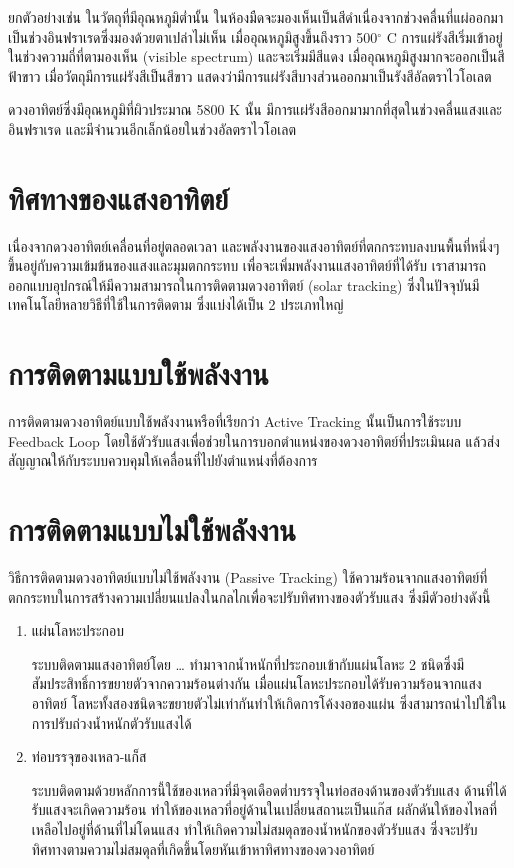 \documentclass[a4paper,nobib,openany]{tufte-book}
\begin{document}
ยกตัวอย่างเช่น ในวัตถุที่มีอุณหภูมิต่ำนั้น
ในห้องมืดจะมองเห็นเป็นสีดำเนื่องจากช่วงคลื่นที่แผ่ออกมาเป็นช่วงอินฟราเรดซึ่งมองด้วยตาเปล่าไม่เห็น
เมื่ออุณหภูมิสูงขึ้นถึงราว 500\(^{\circ}\) C
การแผ่รังสีเริ่มเข้าอยู่ในช่วงความถี่ที่ตามองเห็น (visible spectrum)
และจะเริ่มมีสีแดง เมื่ออุณหภูมิสูงมากจะออกเป็นสีฟ้าขาว
เมื่อวัตถุมีการแผ่รังสีเป็นสีขาว
แสดงว่ามีการแผ่รังสีบางส่วนออกมาเป็นรังสีอัลตราไวโอเลต

ดวงอาทิตย์ซึ่งมีอุณหภูมิที่ผิวประมาณ 5800 K นั้น
มีการแผ่รังสีออกมามากที่สุดในช่วงคลื่นแสงและอินฟราเรด
และมีจำนวนอีกเล็กน้อยในช่วงอัลตราไวโอเลต

\section{ทิศทางของแสงอาทิตย์}
\label{sec:org88cde3c}
เนื่องจากดวงอาทิตย์เคลื่อนที่อยู่ตลอดเวลา
และพลังงานของแสงอาทิตย์ที่ตกกระทบลงบนพื้นที่หนึ่งๆขึ้นอยู่กับความเข้มข้นของแสงและมุมตกกระทบ
เพื่อจะเพิ่มพลังงานแสงอาทิตย์ที่ได้รับ
เราสามารถออกแบบอุปกรณ์ให้มีความสามารถในการติดตามดวงอาทิตย์ (solar
tracking) ซึ่งในปัจจุบันมีเทคโนโลยีหลายวิธีที่ใช้ในการติดตาม
ซึ่งแบ่งได้เป็น 2 ประเภทใหญ่

\section{การติดตามแบบใช้พลังงาน}
\label{sec:org8b0e18a}
การติดตามดวงอาทิตย์แบบใช้พลังงานหรือที่เรียกว่า Active Tracking
นั้นเป็นการใช้ระบบ Feedback Loop
โดยใช้ตัวรับแสงเพื่อช่วยในการบอกตำแหน่งของดวงอาทิตย์ที่ประเมินผล
แล้วส่งสัญญาณให้กับระบบควบคุมให้เคลื่อนที่ไปยังตำแหน่งที่ต้องการ

\section{การติดตามแบบไม่ใช้พลังงาน}
\label{sec:org80a3b7a}
วิธีการติดตามดวงอาทิตย์แบบไม่ใช้พลังงาน (Passive Tracking)
ใช้ความร้อนจากแสงอาทิตย์ที่ตกกระทบในการสร้างความเปลี่ยนแปลงในกลไกเพื่อจะปรับทิศทางของตัวรับแสง
ซึ่งมีตัวอย่างดังนี้

\begin{enumerate}
\item แผ่นโลหะประกอบ

ระบบติดตามแสงอาทิตย์โดย \ldots{} ทำมาจากน้ำหนักที่ประกอบเข้ากับแผ่นโลหะ 2
ชนิดซึ่งมีสัมประสิทธิ์การขยายตัวจากความร้อนต่างกัน
เมื่อแผ่นโลหะประกอบได้รับความร้อนจากแสงอาทิตย์
โลหะทั้งสองชนิดจะขยายตัวไม่เท่ากันทำให้เกิดการโค้งงอของแผ่น
ซึ่งสามารถนำไปใช้ในการปรับถ่วงน้ำหนักตัวรับแสงได้

\item ท่อบรรจุของเหลว-แก็ส

ระบบติดตามด้วยหลักการนี้ใช้ของเหลวที่มีจุดเดือดต่ำบรรจุในท่อสองด้านของตัวรับแสง
ด้านที่ได้รับแสงจะเกิดความร้อน
ทำให้ของเหลวที่อยู่ด้านในเปลี่ยนสถานะเป็นแก๊ส
ผลักดันให้ของไหลที่เหลือไปอยู่ที่ด้านที่ไม่โดนแสง
ทำให้เกิดความไม่สมดุลของน้ำหนักของตัวรับแสง
ซึ่งจะปรับทิศทางตามความไม่สมดุลที่เกิดขึ้นโดยหันเข้าหาทิศทางของดวงอาทิตย์
\end{enumerate}
\end{document}

